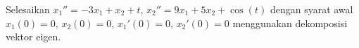 \begin{exercise}
Selesaikan
$x_1'' = -3x_1 + x_2 + t$, $x_2'' = 9x_1 + 5x_2
+\cos(t)$ dengan syarat awal
$x_1(0) = 0$, $x_2(0) = 0$,
$x_1'(0) = 0$, $x_2'(0) = 0$
menggunakan dekomposisi vektor eigen.
\end{exercise}

